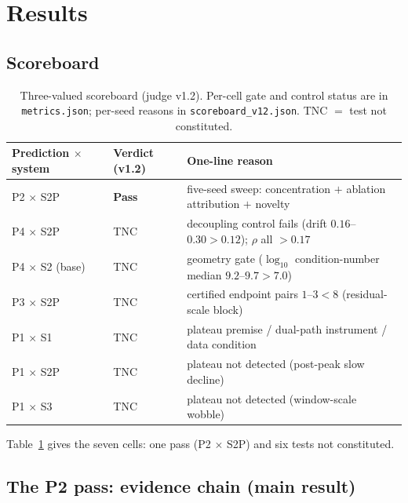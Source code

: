 \documentclass{article}
\begin{document}
\section{Results}

\subsection{Scoreboard}

\begin{table}[t]
\centering
\caption{Three-valued scoreboard (judge v1.2). Per-cell gate and control status
are in \texttt{metrics.json}; per-seed reasons in \texttt{scoreboard\_v12.json}.
TNC $=$ test not constituted.}
\label{tab:scoreboard}
\begin{tabular}{lll}
\toprule
Prediction $\times$ system & Verdict (v1.2) & One-line reason \\
\midrule
P2 $\times$ S2P        & \textbf{Pass} & five-seed sweep: concentration $+$ ablation attribution $+$ novelty \\
P4 $\times$ S2P        & TNC & decoupling control fails (drift $0.16$--$0.30 > 0.12$); $\rho$ all $>0.17$ \\
P4 $\times$ S2 (base)  & TNC & geometry gate ($\log_{10}$ condition-number median $9.2$--$9.7 > 7.0$) \\
P3 $\times$ S2P        & TNC & certified endpoint pairs $1$--$3 < 8$ (residual-scale block) \\
P1 $\times$ S1         & TNC & plateau premise / dual-path instrument / data condition \\
P1 $\times$ S2P        & TNC & plateau not detected (post-peak slow decline) \\
P1 $\times$ S3         & TNC & plateau not detected (window-scale wobble) \\
\bottomrule
\end{tabular}
\end{table}

Table~\ref{tab:scoreboard} gives the seven cells: one pass (P2 $\times$ S2P) and
six tests not constituted.

\subsection{The P2 pass: evidence chain (main result)}
\end{document}
